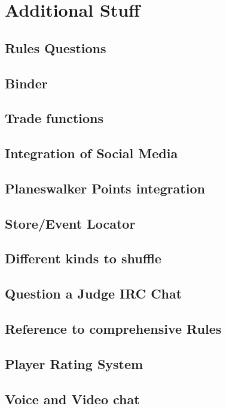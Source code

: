 \chapter{Additional Stuff}

\section{Rules Questions}
	

\section{Binder}
	

\section{Trade functions}
	

\section{Integration of Social Media}
	

\section{Planeswalker Points integration}
	

\section{Store/Event Locator}
	

\section{Different kinds to shuffle}
	

\section{Question a Judge IRC Chat}
	

\section{Reference to comprehensive Rules }
	

\section{Player Rating System}
	

\section{Voice and Video chat}
	